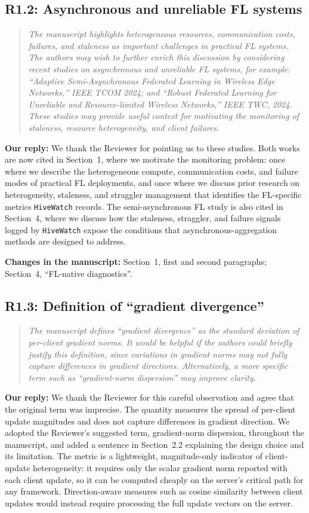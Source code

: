 \documentclass[11pt]{article}
\newenvironment{reviewer}{\begin{quote}\itshape\color{blue}}{\end{quote}}
\newcommand{\comment}[2]{\subsection*{R#1: #2}}
\newcommand{\response}{\noindent\textbf{Our reply:} }
\newcommand{\location}[1]{\noindent\textbf{Changes in the manuscript:} #1}
\newcommand{\HW}{\texttt{HiveWatch}}
\begin{document}
\comment{1.2}{Asynchronous and unreliable FL systems}
\begin{reviewer}
The manuscript highlights heterogeneous resources, communication costs, failures, and staleness as important challenges in practical FL systems. The authors may wish to further enrich this discussion by considering recent studies on asynchronous and unreliable FL systems, for example: ``Adaptive Semi-Asynchronous Federated Learning in Wireless Edge Networks,'' IEEE TCOM 2024; and ``Robust Federated Learning for Unreliable and Resource-limited Wireless Networks,'' IEEE TWC, 2024. These studies may provide useful context for motivating the monitoring of staleness, resource heterogeneity, and client failures.
\end{reviewer}
\response We thank the Reviewer for pointing us to these studies. Both works are now cited in Section~1, where we motivate the monitoring problem: once where we describe the heterogeneous compute, communication costs, and failure modes of practical FL deployments, and once where we discuss prior research on heterogeneity, staleness, and straggler management that identifies the FL-specific metrics \HW{} records. The semi-asynchronous FL study is also cited in Section~4, where we discuss how the staleness, straggler, and failure signals logged by \HW{} expose the conditions that asynchronous-aggregation methods are designed to address.

\location{Section~1, first and second paragraphs; Section~4, ``FL-native diagnostics''.}

\comment{1.3}{Definition of ``gradient divergence''}
\begin{reviewer}
The manuscript defines ``gradient divergence'' as the standard deviation of per-client gradient norms. It would be helpful if the authors could briefly justify this definition, since variations in gradient norms may not fully capture differences in gradient directions. Alternatively, a more specific term such as ``gradient-norm dispersion'' may improve clarity.
\end{reviewer}
\response We thank the Reviewer for this careful observation and agree that the original term was imprecise. The quantity measures the spread of per-client update {magnitudes} and does not capture differences in gradient {direction}. We adopted the Reviewer's suggested term, {gradient-norm dispersion}, throughout the manuscript, and added a sentence in Section~2.2 explaining the design choice and its limitation. The metric is a lightweight, magnitude-only indicator of client-update heterogeneity: it requires only the scalar gradient norm reported with each client update, so it can be computed cheaply on the server's critical path for any framework. Direction-aware measures such as cosine similarity between client updates would instead require processing the full update vectors on the server.
\end{document}
